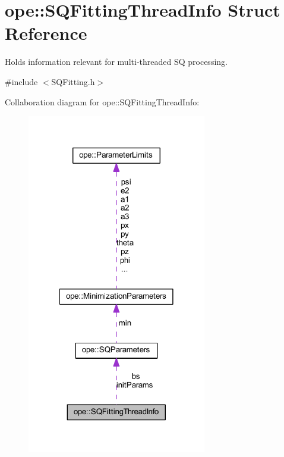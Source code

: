 \hypertarget{structope_1_1_s_q_fitting_thread_info}{\section{ope\-:\-:S\-Q\-Fitting\-Thread\-Info Struct Reference}
\label{structope_1_1_s_q_fitting_thread_info}
}


Holds information relevant for multi-\/threaded S\-Q processing.  




{\ttfamily \#include $<$S\-Q\-Fitting.\-h$>$}



Collaboration diagram for ope\-:\-:S\-Q\-Fitting\-Thread\-Info\-:
\nopagebreak
\begin{figure}[H]
\begin{center}
\leavevmode
\includegraphics[width=222pt]{structope_1_1_s_q_fitting_thread_info__coll__graph}
\end{center}
\end{figure}

